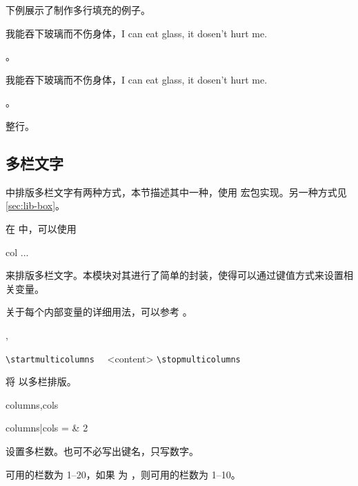 \documentclass{cusdoc}
\begin{document}
下例展示了制作多行填充的例子。
\begin{xample}
\newcommand\filllines[4][]{{%
  #2\filler[#1]%
  \Replicate{#3-1}{\break \rule{0pt}{0.7\baselineskip}\filler[#1]}%
  #4\par}}

我能吞下玻璃而不伤身体，I can eat glass, it dosen't hurt me.
\filllines{\linespread{2}\selectfont}{3}{。\hspace*{1em}}

我能吞下玻璃而不伤身体，I can eat glass, it dosen't hurt me.
\filllines[color=red,dotted]{\linespread{2}\selectfont}{3}{。\hspace*{1em}}

\filllines [raise=-.5ex]{\linespread{2}\selectfont \noindent\strut}{3}{ 整行。\hspace*{1em}}
\stopxamplecode
\xampleprint  
\end{xample}


\subsection{多栏文字}\label{sec:multicol}

\CusTeX 中排版多栏文字有两种方式，本节描述其中一种，使用  宏包实现。另一种方式见\cref{sec:lib-box}。

在  中，可以使用 
\begin{xample}
\begin{multicols}{col}
  ... 
\end{multicols}
\stopxamplecode 
\xamplecode \medskip 
\end{xample}
来排版多栏文字。本模块对其进行了简单的封装，使得可以通过键值方式来设置相关变量。

关于每个内部变量的详细用法，可以参考 。

\begin{function}{\startmulticolumns,\stopmulticolumns}
  \begin{syntax}
    \verb|\startmulticolumns| 
    ~~<content>
    \verb|\stopmulticolumns|
  \end{syntax}
将  以多栏排版。
\end{function}

\begin{keyval}[path=multicolumns]{columns,cols}
  \begin{syntax}
    columns|cols =  & 2
  \end{syntax}
设置多栏数。也可不必写出键名，只写数字。

可用的栏数为 1--20，如果  为
，则可用的栏数为 1--10。
\end{keyval}
\end{document}
